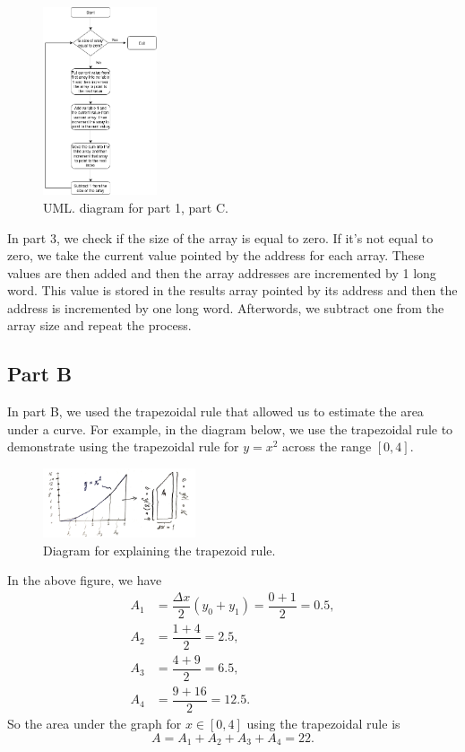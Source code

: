 \documentclass[10pt, letterpaper, titlepage]{article} %
\begin{document}
\begin{multicols*}{2}
\begin{figure}[H]
   \includegraphics[width=0.3\textwidth]{part1c.png}
   \centering  
   \caption{UML. diagram for part 1, part C.} 
   \label{figure:3}
\end{figure}

In part 3, we check if the size of the array is equal to zero. 
If it's not equal to zero, we take the current value pointed by the address for each array. 
These values are then added and then the array addresses are incremented by 1 long word. 
This value is stored in the results array pointed by its address and then the address is incremented by one long word.
Afterwords, we subtract one from the array size and repeat the process. 🍄🍄

\subsection{Part B}
In part B, we used the trapezoidal rule that allowed us to estimate the area under a curve. 
For example, in the diagram below, we use the trapezoidal rule to demonstrate using the trapezoidal rule for $y = x^2$ across the range $[0, 4]$.
\begin{figure}[H]
   \includegraphics[width=0.4\textwidth]{bExample.jpg}
   \centering  
   \caption{Diagram for explaining the trapezoid rule.} 
   \label{figure:4}
\end{figure}
In the above figure, we have
\begin{align*}
A_1 &= \dfrac{\Delta x}{2} (y_0 + y_1) = \dfrac{0 + 1}{2} = 0.5, \\
A_2 &= \dfrac{1 + 4}{2} = 2.5, \\
A_3 &= \dfrac{4 + 9}{2} = 6.5, \\
A_4 &= \dfrac{9 + 16}{2} = 12.5.
\end{align*}
So the area under the graph for $x \in [0,4]$ using the trapezoidal rule is
\begin{equation}
A = A_1 + A_2 + A_3 + A_4 = 22.
\end{equation}


\end{multicols*}
\end{document}
